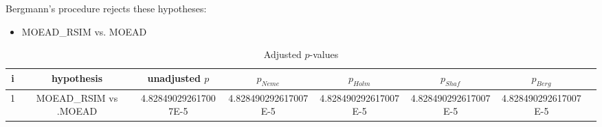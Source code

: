 \documentclass[a4paper,10pt]{article}
\begin{document}
\begin{landscape}
Bergmann's procedure rejects these hypotheses:


\begin{itemize}


\item MOEAD_RSIM vs. MOEAD
\end{itemize}


\begin{table}[!htp]
\centering\tiny
\caption{Adjusted $p$-values}
\begin{tabular}{cccccccc}
i&hypothesis&unadjusted $p$&$p_{Neme}$&$p_{Holm}$&$p_{Shaf}$&$p_{Berg}$\\
\hline
1&MOEAD_RSIM vs .MOEAD&4.828490292617007E-5&4.828490292617007E-5&4.828490292617007E-5&4.828490292617007E-5&4.828490292617007E-5\\
\hline
\end{tabular}
\end{table}

\end{landscape}
\end{document}
